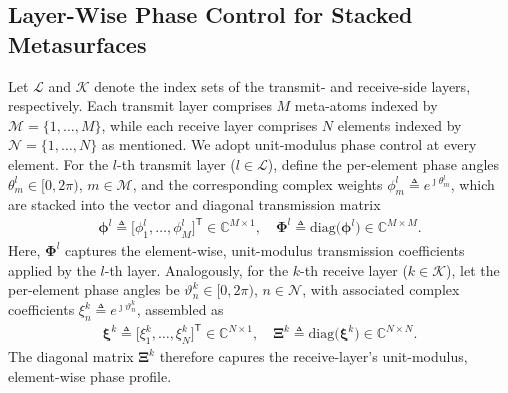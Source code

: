 \documentclass[twocolumn,10pt]{IEEEtran}
\newcommand{\T}{{\scriptscriptstyle\mathsf{T}}}
\begin{document}
\subsection{Layer-Wise Phase Control for Stacked Metasurfaces}
Let $\mathcal{L}$ and $\mathcal{K}$ denote the index sets of the transmit- and receive-side layers, respectively. Each transmit layer comprises $M$ meta-atoms indexed by $\mathcal{M}=\{1,\ldots,M\}$, while each receive layer comprises $N$ elements indexed by $\mathcal{N}=\{1,\ldots,N\}$ as mentioned. We adopt unit-modulus phase control at every element. For the $l$-th transmit layer ($l\in\mathcal{L}$), define the per-element phase angles $\theta_{m}^{l}\in[0,2\pi)$, $m\in\mathcal{M}$, and the corresponding complex weights $	\phi_{m}^{l} \triangleq e^{\jmath \theta_{m}^{l}}$, 
which are stacked into the vector and diagonal transmission matrix
\begin{align}
	\boldsymbol{\phi}^{l} \!\triangleq\! \big[\phi_{1}^{l},\ldots,\phi_{M}^{l}\big]^{\T}\!\!\in\mathbb{C}^{M\times 1}, \!\!\quad
	\boldsymbol{\Phi}^{l} \!\triangleq\! \mathrm{diag}\big(\boldsymbol{\phi}^{l}\big)\!\!\in\mathbb{C}^{M\times M}. \label{eq:tx_Phi}
\end{align}
Here, $\boldsymbol{\Phi}^{l}$ captures the element-wise, unit-modulus transmission coefficients applied by the $l$-th layer. Analogously, for the $k$-th receive layer ($k\in\mathcal{K}$), let the per-element phase angles be $\vartheta_{n}^{k}\in[0,2\pi)$, $n\in\mathcal{N}$, with associated complex coefficients $\xi_{n}^{k} \triangleq e^{\jmath \vartheta_{n}^{k}}$, 
assembled as
\begin{align}
	\boldsymbol{\xi}^{k} \!\triangleq\! \big[\xi_{1}^{k},\ldots,\xi_{N}^{k}\big]^{\T}\!\!\in\mathbb{C}^{N\times 1}, 
	\quad \!\!\boldsymbol{\Xi}^{k} \!\triangleq\! \mathrm{diag}\big(\boldsymbol{\xi}^{k}\big)\!\!\in\mathbb{C}^{N\times N}. \label{eq:rx_Xi}
\end{align}
The diagonal matrix $\boldsymbol{\Xi}^{k}$ therefore capures the receive-layer's unit-modulus, element-wise phase profile.
\end{document}
